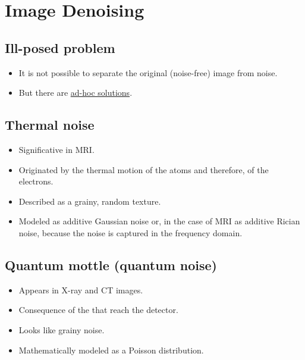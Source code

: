 \chapter{Image Denoising}

\section{Ill-posed problem}
\begin{itemize}
\item It is not possible to separate the original (noise-free) image from noise.
\item But there are
  \href{https://en.wikipedia.org/wiki/Noise_reduction\#In_images}{ad-hoc
    solutions}.
\end{itemize}

\section{Thermal noise}
\begin{itemize}
\item Significative in \gls{MRI}.
\item Originated by the thermal motion of the atoms and therefore, of
  the electrons.
\item Described as a grainy, random texture.
\item Modeled as additive Gaussian noise or, in the case of \gls{MRI}
  as additive Rician noise, because the noise is captured in the
  frequency domain.
\end{itemize}

\section{Quantum mottle (quantum noise)}
\begin{itemize}
\item Appears in X-ray and \gls{CT} images.
\item Consequence of the  that reach the detector.
\item Looks like grainy noise. 
\item Mathematically modeled as a  Poisson
  distribution.
\end{itemize}

